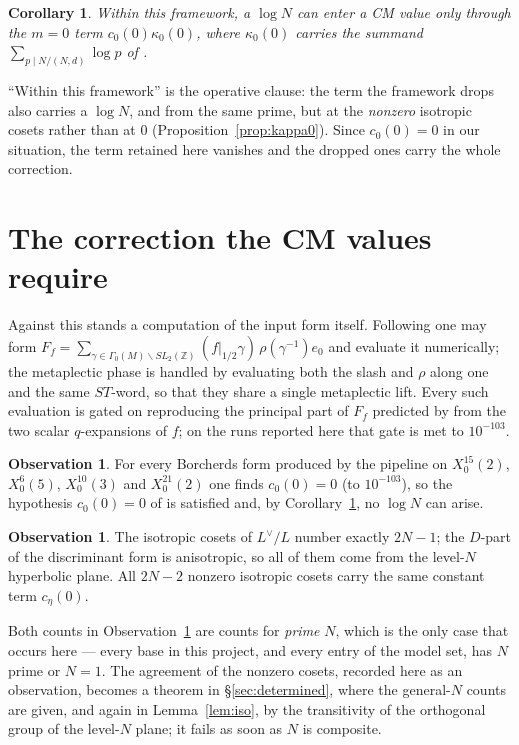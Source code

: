 \documentclass[11pt,reqno]{amsart}
\theoremstyle{plain}
\newtheorem{corollary}[theorem]{Corollary}
\theoremstyle{definition}
\newtheorem{observation}[theorem]{Observation}
\newcommand{\Z}{\mathbb{Z}}
\newcommand{\Ldual}{L^{\vee}}
\begin{document}
\begin{corollary}\label{cor:onlyplace}
Within this framework, a $\log N$ can enter a CM value only through the $m=0$ term
$c_0(0)\kappa_0(0)$, where $\kappa_0(0)$ carries the summand $\sum_{p\mid N/(N,d)}\log p$ of
\cite[Remark 15(2), Lemma 20]{Yang}.
\end{corollary}

\noindent
``Within this framework'' is the operative clause: the term the framework drops also carries a
$\log N$, and from the same prime, but at the \emph{nonzero} isotropic cosets rather than at $0$
(Proposition~\ref{prop:kappa0}). Since $c_0(0)=0$ in our situation, the term retained here
vanishes and the dropped ones carry the whole correction.

\section{The correction the CM values require}\label{sec:data}

Against this stands a computation of the input form itself. Following \cite[eq.~(6)]{GY} one may
form
$F_f=\sum_{\gamma\in\Gamma_0(M)\backslash SL_2(\Z)}(f\vert_{1/2}\gamma)\,\rho(\gamma^{-1})e_0$
and evaluate it numerically; the metaplectic phase is handled by evaluating both the slash and
$\rho$ along one and the same $ST$-word, so that they share a single metaplectic lift. Every such
evaluation is gated on reproducing the principal part of $F_f$ predicted by \cite[Lemma 24]{GY} from
the two scalar $q$-expansions of $f$; on the runs reported here that gate is met to $10^{-103}$.

\begin{observation}\label{obs:c00}
For every Borcherds form produced by the pipeline on $X_0^{15}(2)$, $X_0^{6}(5)$, $X_0^{10}(3)$ and
$X_0^{21}(2)$ one finds $c_0(0)=0$ (to $10^{-103}$), so the hypothesis $c_0(0)=0$ of
\cite[Thm.~B]{GY} is satisfied and, by Corollary~\ref{cor:onlyplace}, no $\log N$ can arise.
\end{observation}

\begin{observation}\label{obs:iso}
The isotropic cosets of $\Ldual/L$ number exactly $2N-1$; the $D$-part of the discriminant form is
anisotropic, so all of them come from the level-$N$ hyperbolic plane. All $2N-2$ nonzero isotropic
cosets carry the same constant term $c_\eta(0)$.
\end{observation}

Both counts in Observation~\ref{obs:iso} are counts for \emph{prime} $N$, which is the only case
that occurs here --- every base in this project, and every entry of the model set, has $N$ prime
or $N=1$. The agreement of the nonzero cosets, recorded here as an observation, becomes a theorem
in \S\ref{sec:determined}, where the general-$N$ counts are given, and again in
Lemma~\ref{lem:iso}, by the transitivity of the orthogonal group of the level-$N$ plane; it fails
as soon as $N$ is composite.
\end{document}
